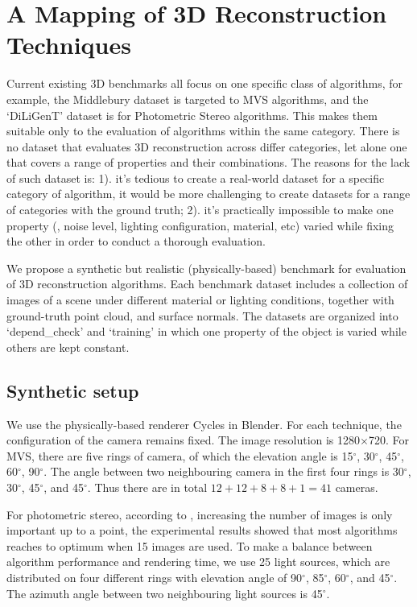 
\chapter{A Mapping of 3D Reconstruction Techniques}
\label{ch:3DRecon_Mapping}
Current existing 3D benchmarks all focus on one specific class of algorithms, for example, the Middlebury dataset is targeted to MVS algorithms, and the `DiLiGenT' dataset is for Photometric Stereo algorithms. This makes them suitable only to the evaluation of algorithms within the same category. There is no dataset that evaluates 3D reconstruction across differ categories, let alone one that covers a range of properties and their combinations. The reasons for the lack of such dataset is: 1). it's tedious to create a real-world dataset for a specific category of algorithm, it would be more challenging to create datasets for a range of categories with the ground truth; 2). it's practically impossible to make one property (\eg, noise level, lighting configuration, material, etc) varied while fixing the other in order to conduct a thorough evaluation.

We propose a synthetic but realistic (physically-based) benchmark for evaluation of 3D reconstruction algorithms. Each benchmark dataset includes a collection of images of a scene under different material or lighting conditions, together with ground-truth point cloud, and surface normals. The datasets are organized into `depend\_check' and `training' in which one property of the object is varied while others are kept constant.

\section{Synthetic setup}
We use the physically-based renderer Cycles in Blender. For each technique, the configuration of the camera remains fixed. The image resolution is 1280$\times$720. For MVS, there are five rings of camera, of which the elevation angle is 15$^\circ$, 30$^\circ$, 45$^\circ$, 60$^\circ$, 90$^\circ$. The angle between two neighbouring camera in the first four rings is 30$^\circ$, 30$^\circ$, 45$^\circ$, and 45$^\circ$. Thus there are in total $12+12+8+8+1=41$ cameras.

For photometric stereo, according to \cite{Berkiten2016rgbn}, increasing the number of images is only important up to a point, the experimental results showed that most algorithms reaches to optimum when 15 images are used. To make a balance between algorithm performance and rendering time, we use 25 light sources, which are distributed on four different rings with elevation angle of 90$^\circ$, 85$^\circ$, 60$^\circ$, and 45$^\circ$. The azimuth angle between two neighbouring light sources is 45$^\circ$.

